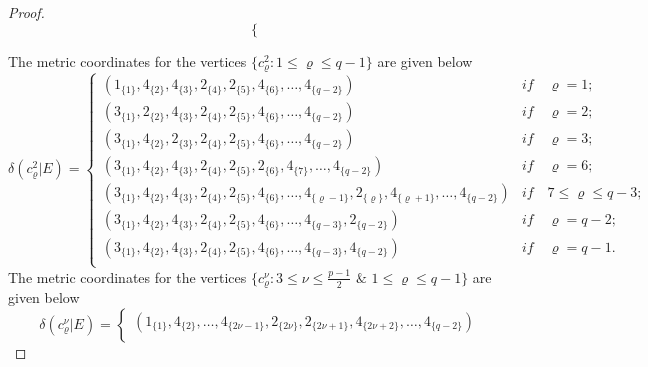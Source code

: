 \documentclass[]{interact}
\theoremstyle{plain}%
\theoremstyle{definition}
\theoremstyle{remark}
\begin{document}
\begin{proof}
\begin{equation*}
\begin{cases}
                    \end{cases}
                    \end{equation*}

                    \noindent The metric coordinates for the vertices 
                     $\{c^2_\varrho: 1\leq \varrho\leq q-1 \}$ are given below
                        \begin{equation*}
                        \delta(c^{2}_{\varrho}|E)=
                   \begin{cases}
                   (1_{\{1\}},4_{\{2\}},4_{\{3\}},2_{\{4\}}, 2_{\{5\}}, 4_{\{6\}}, \ldots,4_{\{q-2\}})&\textit{if}\quad\varrho= 1;\\
                   (3_{\{1\}},2_{\{2\}},4_{\{3\}},2_{\{4\}}, 2_{\{5\}}, 4_{\{6\}},\ldots,4_{\{q-2\}})&\textit{if}\quad\varrho= 2;\\
                     (3_{\{1\}},4_{\{2\}},2_{\{3\}},2_{\{4\}}, 2_{\{5\}}, 4_{\{6\}},\ldots,4_{\{q-2\}})&\textit{if}\quad\varrho= 3;\\
                     (3_{\{1\}},4_{\{2\}},4_{\{3\}},2_{\{4\}}, 2_{\{5\}}, 2_{\{6\}}, 4_{\{7\}}, \ldots,4_{\{q-2\}})&\textit{if}\quad\varrho= 6;\\
                     (3_{\{1\}},4_{\{2\}}, 4_{\{3 \}},2_{\{ 4 \}}, 2_{\{ 5 \}}, 4_{\{ 6 \}}, \ldots, 4_{\{\varrho-1 \}},2_{\{\varrho \}}, 4_{\{\varrho+1 \}},\ldots,4_{\{q-2\}})&\textit{if}\quad 7 \leq  \varrho  \leq q-3  ;\\
                      (3_{\{1\}},4_{\{2\}},4_{\{3\}},2_{\{4\}}, 2_{\{5\}}, 4_{\{6\}}, \ldots, 4_{\{q-3\}} ,2_{\{q-2\}})&\textit{if}\quad\varrho= q-2;\\
                    (3_{\{1\}},4_{\{2\}},4_{\{3\}},2_{\{4\}}, 2_{\{5\}}, 4_{\{6\}},\ldots,4_{\{q-3\}} ,4_{\{q-2\}})&\textit{if}\quad\varrho= q-1.\\
                    \end{cases}
                    \end{equation*}
                 \noindent The metric coordinates for the vertices 
                     $\{c^\nu_\varrho:3\leq \nu\leq \frac{p-1}{2}$  $\&$  $1\leq \varrho\leq q-1 \}$ are given below
                        \begin{equation*}
                        \delta(c^{\nu}_{\varrho}|E)=
                   \begin{cases}
                   (1_{\{1\}},4_{\{2\}},\ldots, 4_{\{2\nu-1\}},2_{\{2\nu\}},2_{\{2\nu+1\}},4_{\{2\nu+2\}},\ldots,4_{\{q-2\}})\\

\end{cases}
\end{equation*}
\end{proof}
\end{document}
